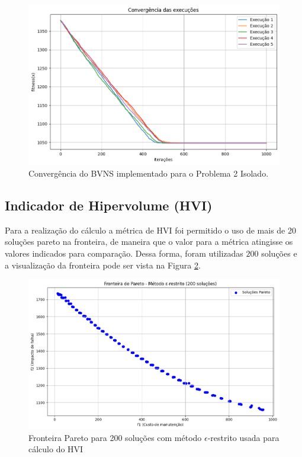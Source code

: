\documentclass[conference]{IEEEtran}
\begin{document}
\begin{figure}[htbp]
    \centering
    \includegraphics[width=\columnwidth,trim=1 1 1 1,clip]{convergencia_execucoes.png}
    \caption{\label{fig:convergencia_execucoes_p2}Convergência do BVNS implementado para o Problema 2 Isolado.}
\end{figure}

\subsection{Indicador de Hipervolume (HVI)}

Para a realização do cálculo a métrica de HVI foi permitido o uso de mais de 20 soluções pareto na fronteira, de maneira que o valor para a métrica atingisse
os valores indicados para comparação. Dessa forma, foram utilizadas $200$ soluções e a visualização da fronteira pode ser vista na Figura \ref{fig:plotFronteiraParetoERestrito200pontos}.

\begin{figure}[htbp]
    \centering
    \includegraphics[width=\columnwidth,trim=1 1 1 1,clip]{plotFronteiraParetoERestrito200pontos.png}
    \caption{\label{fig:plotFronteiraParetoERestrito200pontos}Fronteira Pareto para 200 soluções com método $\epsilon$-restrito usada para cálculo do HVI}
\end{figure}
\end{document}
